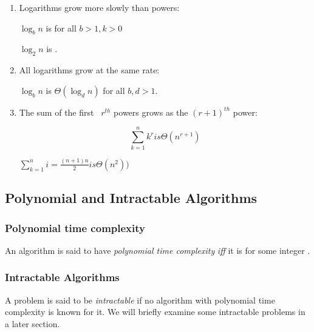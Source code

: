 \begin{enumerate}
\item Logarithms grow more slowly than powers:

$\log_b{n}$ is  for all $b > 1, k > 0$

\EG $\log_2{n}$ is .


\item All logarithms grow at the same rate: 

$\log_b{n}$ is $\Theta(\log_d{n})$ for all $b, d > 1$.

\item The sum of the first \nx\ $r^{th}$ powers grows as
the $(r+1)^{th}$ power:

\[ \sum_{k=1}^{n} k^{r} is \Theta(n^{r+1})  \]
\begin{center}
\EG \( \sum_{k=1}^{n} i = \frac{(n+1)n}{2} is \Theta(n^2))  \)
\end{center}

\end{enumerate}

\subsection{Polynomial and Intractable Algorithms}

\subsubsection{Polynomial time complexity}

An algorithm is said to have {\it polynomial time complexity}
{\it iff} it is  for some integer .

\subsubsection{Intractable Algorithms}
A problem is said to be {\it intractable} if no algorithm 
with polynomial time complexity is known for it.
We will briefly examine some intractable problems in
a later section.

